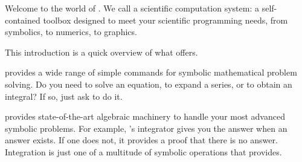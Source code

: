 



Welcome to the world of \Language{}.
We call \Language{} a scientific computation system:
a self-contained toolbox designed to meet
your scientific programming needs,
from symbolics, to numerics, to graphics.

This introduction is a quick overview of what \Language{} offers.


\Language{} provides a wide range of
simple commands for
symbolic mathematical problem solving.
Do you need to solve an equation,
to expand a series,
or to obtain an integral?
If so, just ask \Language{} to do it.

%

\newpage
\Language{} provides state-of-the-art algebraic machinery to
handle your most advanced symbolic problems.
For example, \Language{}'s integrator gives you the answer
when an answer exists.
If one does not, it provides a proof that
there is no answer.
Integration is just one of a multitude of symbolic operations that
\Language{} provides.


